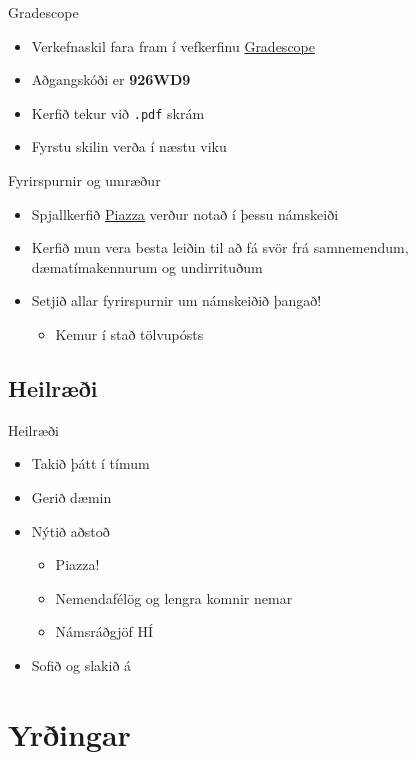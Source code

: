 \documentclass[handout]{beamer}
\begin{document}
\begin{frame}{Gradescope}
\begin{itemize}
 \item Verkefnaskil fara fram í vefkerfinu \href{https://gradescope.com/}{Gradescope}
 \item Aðgangskóði er \textbf{926WD9}
 \item Kerfið tekur við \texttt{.pdf} skrám
 \item Fyrstu skilin verða í næstu viku
\end{itemize}
\end{frame}

\begin{frame}{Fyrirspurnir og umræður}
\label{frame:piazza}
\begin{itemize}
 \item Spjallkerfið \href{https://piazza.com/hi.is/fall2016/tol104g}{Piazza} verður notað í þessu námskeiði
 \item Kerfið mun vera besta leiðin til að fá svör frá samnemendum, dæmatímakennurum og undirrituðum
 \item Setjið allar fyrirspurnir um námskeiðið þangað!
 \begin{itemize}
  \item Kemur í stað tölvupósts
 \end{itemize}
\end{itemize}
\end{frame}

\subsection{Heilræði}

\begin{frame}{Heilræði}
\pause
\begin{itemize}
 \item Takið þátt í tímum\pause
 \item Gerið dæmin \pause
 \item Nýtið aðstoð 
 \begin{itemize}
  \item Piazza!
  \item Nemendafélög og lengra komnir nemar
  \item Námsráðgjöf HÍ \pause
 \end{itemize}
 \item Sofið og slakið á
\end{itemize}
\end{frame}

\section{Yrðingar}
\end{document}
